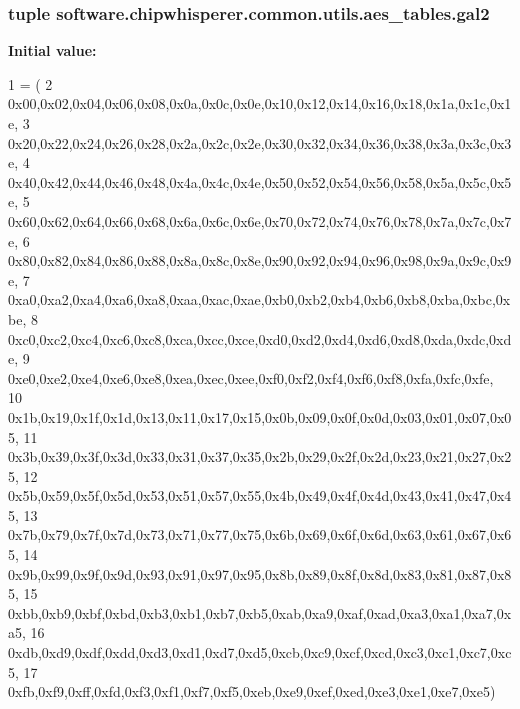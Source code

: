 \subsubsection[{gal2}]{\setlength{\rightskip}{0pt plus 5cm}tuple software.\+chipwhisperer.\+common.\+utils.\+aes\+\_\+tables.\+gal2}\label{namespacesoftware_1_1chipwhisperer_1_1common_1_1utils_1_1aes__tables_a0ac094d352370182a354f0e394cdeb5f}
{\bfseries Initial value\+:}
\begin{DoxyCode}
1 = (
2 0x00,0x02,0x04,0x06,0x08,0x0a,0x0c,0x0e,0x10,0x12,0x14,0x16,0x18,0x1a,0x1c,0x1e,
3 0x20,0x22,0x24,0x26,0x28,0x2a,0x2c,0x2e,0x30,0x32,0x34,0x36,0x38,0x3a,0x3c,0x3e,
4 0x40,0x42,0x44,0x46,0x48,0x4a,0x4c,0x4e,0x50,0x52,0x54,0x56,0x58,0x5a,0x5c,0x5e,
5 0x60,0x62,0x64,0x66,0x68,0x6a,0x6c,0x6e,0x70,0x72,0x74,0x76,0x78,0x7a,0x7c,0x7e,
6 0x80,0x82,0x84,0x86,0x88,0x8a,0x8c,0x8e,0x90,0x92,0x94,0x96,0x98,0x9a,0x9c,0x9e,
7 0xa0,0xa2,0xa4,0xa6,0xa8,0xaa,0xac,0xae,0xb0,0xb2,0xb4,0xb6,0xb8,0xba,0xbc,0xbe,
8 0xc0,0xc2,0xc4,0xc6,0xc8,0xca,0xcc,0xce,0xd0,0xd2,0xd4,0xd6,0xd8,0xda,0xdc,0xde,
9 0xe0,0xe2,0xe4,0xe6,0xe8,0xea,0xec,0xee,0xf0,0xf2,0xf4,0xf6,0xf8,0xfa,0xfc,0xfe,
10 0x1b,0x19,0x1f,0x1d,0x13,0x11,0x17,0x15,0x0b,0x09,0x0f,0x0d,0x03,0x01,0x07,0x05,
11 0x3b,0x39,0x3f,0x3d,0x33,0x31,0x37,0x35,0x2b,0x29,0x2f,0x2d,0x23,0x21,0x27,0x25,
12 0x5b,0x59,0x5f,0x5d,0x53,0x51,0x57,0x55,0x4b,0x49,0x4f,0x4d,0x43,0x41,0x47,0x45,
13 0x7b,0x79,0x7f,0x7d,0x73,0x71,0x77,0x75,0x6b,0x69,0x6f,0x6d,0x63,0x61,0x67,0x65,
14 0x9b,0x99,0x9f,0x9d,0x93,0x91,0x97,0x95,0x8b,0x89,0x8f,0x8d,0x83,0x81,0x87,0x85,
15 0xbb,0xb9,0xbf,0xbd,0xb3,0xb1,0xb7,0xb5,0xab,0xa9,0xaf,0xad,0xa3,0xa1,0xa7,0xa5,
16 0xdb,0xd9,0xdf,0xdd,0xd3,0xd1,0xd7,0xd5,0xcb,0xc9,0xcf,0xcd,0xc3,0xc1,0xc7,0xc5,
17 0xfb,0xf9,0xff,0xfd,0xf3,0xf1,0xf7,0xf5,0xeb,0xe9,0xef,0xed,0xe3,0xe1,0xe7,0xe5)
\end{DoxyCode}
\hypertarget{namespacesoftware_1_1chipwhisperer_1_1common_1_1utils_1_1aes__tables_afccddd28f57f23c2289277deb3dc8f61}{}
